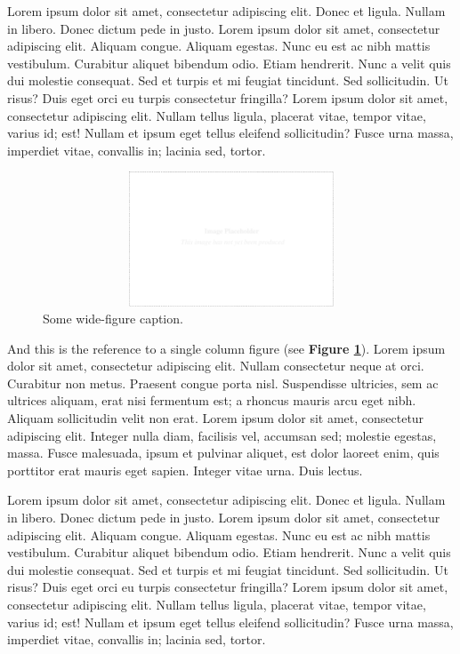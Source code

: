 \documentclass[a4paper,10pt]{article}
\begin{document}
\begin{multicols}{2}
Lorem ipsum dolor sit amet, consectetur adipiscing elit. Donec et ligula. Nullam
in libero. Donec dictum pede in justo. Lorem ipsum dolor sit amet, consectetur
adipiscing elit. Aliquam congue. Aliquam egestas. Nunc eu est ac nibh mattis
vestibulum. Curabitur aliquet bibendum odio. Etiam hendrerit. Nunc a velit quis
dui molestie consequat. Sed et turpis et mi feugiat tincidunt. Sed sollicitudin.
Ut risus? Duis eget orci eu turpis consectetur fringilla? Lorem ipsum dolor sit
amet, consectetur adipiscing elit. Nullam tellus ligula, placerat vitae, tempor
vitae, varius id; est! Nullam et ipsum eget tellus eleifend sollicitudin? Fusce
urna massa, imperdiet vitae, convallis in; lacinia sed, tortor.

\begin{figure}[t]
  \centering
 \includegraphics[width=16cm, height=4cm]{./eps/placeholder.eps}
 \caption{Some wide-figure caption.}
 \label{fig:myfigure2}
\end{figure}

And this is the reference to a single column figure (see {\bf Figure
\ref{fig:myfigure2}}). Lorem ipsum dolor sit amet, consectetur adipiscing elit.
Nullam consectetur neque at orci. Curabitur non metus. Praesent congue porta
nisl. Suspendisse ultricies, sem ac ultrices aliquam, erat nisi fermentum est; a
rhoncus mauris arcu eget nibh. Aliquam sollicitudin velit non erat. Lorem ipsum
dolor sit amet, consectetur adipiscing elit. Integer nulla diam, facilisis vel,
accumsan sed; molestie egestas, massa. Fusce malesuada, ipsum et pulvinar
aliquet, est dolor laoreet enim, quis porttitor erat mauris eget sapien. Integer
vitae urna. Duis lectus.

Lorem ipsum dolor sit amet, consectetur adipiscing elit. Donec et ligula. Nullam
in libero. Donec dictum pede in justo. Lorem ipsum dolor sit amet, consectetur
adipiscing elit. Aliquam congue. Aliquam egestas. Nunc eu est ac nibh mattis
vestibulum. Curabitur aliquet bibendum odio. Etiam hendrerit. Nunc a velit quis
dui molestie consequat. Sed et turpis et mi feugiat tincidunt. Sed sollicitudin.
Ut risus? Duis eget orci eu turpis consectetur fringilla? Lorem ipsum dolor sit
amet, consectetur adipiscing elit. Nullam tellus ligula, placerat vitae, tempor
vitae, varius id; est! Nullam et ipsum eget tellus eleifend sollicitudin? Fusce
urna massa, imperdiet vitae, convallis in; lacinia sed, tortor.


\end{multicols}
\end{document}

